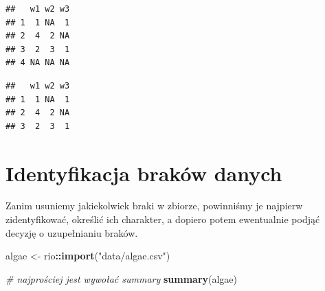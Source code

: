 \documentclass[]{book}
\newenvironment{Shaded}{\begin{snugshade}}{\end{snugshade}}
\newcommand{\CommentTok}[1]{\textcolor[rgb]{0.56,0.35,0.01}{\textit{#1}}}
\newcommand{\KeywordTok}[1]{\textcolor[rgb]{0.13,0.29,0.53}{\textbf{#1}}}
\newcommand{\NormalTok}[1]{#1}
\newcommand{\OperatorTok}[1]{\textcolor[rgb]{0.81,0.36,0.00}{\textbf{#1}}}
\newcommand{\StringTok}[1]{\textcolor[rgb]{0.31,0.60,0.02}{#1}}
\theoremstyle{plain}
\theoremstyle{definition}
\theoremstyle{definition}
\theoremstyle{definition}
\theoremstyle{definition}
\theoremstyle{remark}
\begin{document}
\begin{verbatim}
##   w1 w2 w3
## 1  1 NA  1
## 2  4  2 NA
## 3  2  3  1
## 4 NA NA NA
\end{verbatim}

\begin{Shaded}
\end{Shaded}

\begin{verbatim}
##   w1 w2 w3
## 1  1 NA  1
## 2  4  2 NA
## 3  2  3  1
\end{verbatim}

\hypertarget{identyfikacja-brakow-danych}{%
\section{Identyfikacja braków danych}\label{identyfikacja-brakow-danych}}

Zanim usuniemy jakiekolwiek braki w zbiorze, powinniśmy je najpierw zidentyfikować, określić ich charakter, a dopiero potem ewentualnie podjąć decyzję o uzupełnianiu braków.

\begin{Shaded}
\begin{Highlighting}[]
\NormalTok{algae <-}\StringTok{ }\NormalTok{rio}\OperatorTok{::}\KeywordTok{import}\NormalTok{(}\StringTok{"data/algae.csv"}\NormalTok{)}

\CommentTok{# najprościej jest wywołać summary}
\KeywordTok{summary}\NormalTok{(algae)}
\end{Highlighting}
\end{Shaded}
\end{document}
